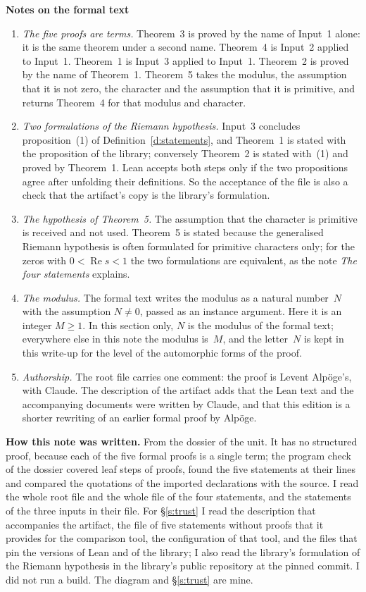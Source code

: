 \documentclass[11pt,a4paper]{article}
\newcommand{\m}[1]{\mbox{$#1$}}        %
\newcommand{\sect}[2]{\refstepcounter{section}\label{#2}\par\addvspace{19pt plus 4pt minus 2pt}\Needspace{7\baselineskip}%
  \noindent\llap{{\fontsize{13.2}{16}\selectfont\bfseries\color{inkfaint}\thesection}\hspace{9pt}}%
  {\fontsize{13.2}{16}\selectfont\bfseries\color{ink}#1}\par\nopagebreak\vspace{-1pt}}
\newcommand{\subhead}[1]{\par\addvspace{9pt plus 2pt}\Needspace{4\baselineskip}\noindent\textbf{#1}\enspace\ignorespaces}
\theoremstyle{plainx}
\theoremstyle{uprightx}
\newcommand{\re}{\operatorname{Re}}
\begin{document}
\sect{Notes on the formal text}{s:notes}
\begin{enumerate}[label=\textup{\arabic*.},leftmargin=1.6em,itemsep=5pt]
\item \emph{The five proofs are terms.} Theorem~3 is proved by the name of Input~1 alone: it is the same theorem
under a second name. Theorem~4 is Input~2 applied to Input~1. Theorem~1 is Input~3 applied to Input~1. Theorem~2
is proved by the name of Theorem~1. Theorem~5 takes the modulus, the assumption that it is not zero, the character
and the assumption that it is primitive, and returns Theorem~4 for that modulus and character.
\item \emph{Two formulations of the Riemann hypothesis.} Input~3 concludes proposition~(1) of
Definition~\ref{d:statements}, and Theorem~1 is stated with the proposition of the library; conversely Theorem~2 is
stated with~(1) and proved by Theorem~1. Lean accepts both steps only if the two propositions agree after
unfolding their definitions. So the acceptance of the file is also a check that the artifact's copy is the
library's formulation.
\item \emph{The hypothesis of Theorem~5.} The assumption that the character is primitive is received and not used.
Theorem~5 is stated because the generalised Riemann hypothesis is often formulated for primitive characters only;
for the zeros with \m{0<\re s<1} the two formulations are equivalent, as the note \emph{The four statements}
explains.
\item \emph{The modulus.} The formal text writes the modulus as a natural number~$N$ with the assumption
\m{N\ne0}, passed as an instance argument. Here it is an integer \m{M\ge1}. In this section only, $N$ is the modulus of the formal text; everywhere else in
this note the modulus is~$M$, and the letter~$N$ is kept in this write-up for the level of the automorphic forms of the proof.
\item \emph{Authorship.} The root file carries one comment: the proof is Levent Alpöge's, with Claude. The
description of the artifact adds that the Lean text and the accompanying documents were written by Claude, and
that this edition is a shorter rewriting of an earlier formal proof by Alpöge.
\end{enumerate}

\subhead{How this note was written.} From the dossier of the unit. It has no structured proof, because each of
the five formal proofs is a single term; the program check of the dossier covered \UnitSteps{} leaf steps of
\UnitProofs{} proofs, found the five statements at their lines and compared the quotations of the imported
declarations with the source. I read the whole root file and the whole file of the four statements, and the
statements of the three inputs in their file. For §\ref{s:trust} I read the description that accompanies the
artifact, the file of five statements without proofs that it provides for the comparison tool, the configuration
of that tool, and the files that pin the versions of Lean and of the library; I also read the library's
formulation of the Riemann hypothesis in the library's public repository at the pinned commit. I did not run a
build. The diagram and §\ref{s:trust} are mine.
\end{document}
